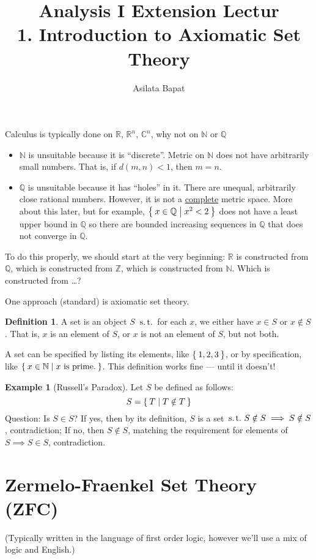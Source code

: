 \documentclass[12pt]{amsart}
\title[Introduction to Axiomatic Set Theory]
	{Analysis I Extension Lectur\\1. Introduction to Axiomatic Set Theory}
\author{Asilata Bapat}
\newcommand{\bbR}{\mathbb{R}}
\newcommand{\bbN}{\mathbb{N}}
\newcommand{\bbZ}{\mathbb{Z}}
\newcommand{\bbQ}{\mathbb{Q}}
\newcommand{\bbC}{\mathbb{C}}
\newcommand{\suchthat}{\operatorname{\thinspace s.t. \thinspace}}
\theoremstyle{plain}
\theoremstyle{remark}
\theoremstyle{definition}
\newtheorem*{define}{Definition}
\newtheorem*{eg}{Example}
\begin{document}
\maketitle
{}

Calculus is typically done on $\bbR$, $\bbR^n$, $\bbC^n$, why not on $\bbN$ or $\bbQ$
\begin{itemize}[-]
	\item $\bbN$ is unsuitable because it is ``discrete''. Metric on $\bbN$ does not have arbitrarily small numbers. That is, if $d(m,n) < 1$, then $m = n$.
	\item $\bbQ$ is unsuitable because it has ``holes'' in it. There are unequal, arbitrarily close rational numbers. However, it is not a 	     \ul{complete} metric space. More about this later, but for example, $\Set{x \in \bbQ | x^2 < 2}$ does not have a least upper bound in $\bbQ$ so there are bounded increasing sequences in $\bbQ$ that does not converge in $\bbQ$.
\end{itemize}
To do this properly, we should start at the very beginning: $\bbR$ is constructed from $\bbQ$, which is constructed from $\bbZ$, which is constructed from $\bbN$. Which is constructed from \dots ?

\par
One approach (standard) is axiomatic set theory.
\begin{define}
	A set is an object $S$ $\suchthat$ for each $x$, we either have $x \in S$ or $x \notin S$. That is, $x$ is an element of $S$, or $x$ is not an element of $S$, but not both.
\end{define}
A set can be specified by listing its elements, like $\Set{1, 2, 3}$, or by specification, like $\Set{x \in \bbN| x \text{ is prime.}}$. This definition works fine --- until it doesn't!
\newline
\begin{eg}[Russell's Paradox]
Let $S$ be defined as follows:
\begin{equation*}
	S = \Set{T| T \notin T}
\end{equation*}
Question: Is $S \in S$?
If yes, then by its definition, $S$ is a set $\suchthat S \notin S \implies S \notin S$, contradiction;
If no, then $S \notin S$, matching the requirement for elements of $S \implies S \in S$, contradiction.
\end{eg}
\section*{\bf Zermelo-Fraenkel Set Theory (ZFC)} 
(Typically written in the language of first order logic, however we'll use a mix of logic and English.)
\end{document}
